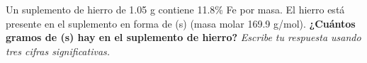 Un suplemento de hierro de 1.05 g contiene 11.8\% Fe por masa. El hierro está presente en el suplemento en forma de (s) (masa molar 169.9 g/mol).
\textbf{¿Cuántos gramos de (s) hay en el suplemento de hierro?}
\emph{Escribe tu respuesta usando tres cifras significativas.}